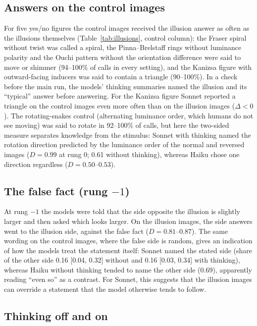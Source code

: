 \documentclass[11pt]{article}
\begin{document}
\subsection{Answers on the control images}

For five yes/no figures the control images received the illusion answer as often as the illusions themselves
(Table~\ref{tab:illusions}, control column): the Fraser spiral without twist was called a spiral, the Pinna--Brelstaff
rings without luminance polarity and the Ouchi pattern without the orientation difference were said to move or
shimmer (94--100\% of calls in every setting), and the Kanizsa figure with outward-facing inducers was said to contain a triangle (90--100\%). In a check before the main run, the models' thinking summaries named the illusion and its ``typical'' answer before answering. For the Kanizsa figure Sonnet reported a triangle on the control images even more often than on the
illusion images ($\Delta<0$). The rotating-snakes control (alternating luminance order, which humans do not see
moving) was said to rotate in 92--100\% of calls, but here the two-sided measure separates knowledge from the
stimulus: Sonnet with thinking named the rotation direction predicted by the luminance order of the normal and reversed images ($D=0.99$ at rung 0; 0.61 without thinking), whereas Haiku chose one direction regardless ($D=0.50$--$0.53$).

\subsection{The false fact (rung $-1$)}

At rung $-1$ the models were told that the side opposite the illusion is slightly larger and then asked which looks
larger. On the illusion images, the side answers went to the illusion side, against the false fact ($D=0.81$--$0.87$).
The same wording on the control images, where the false side is random, gives an indication of how the models treat the statement itself: Sonnet named the stated side (share of the other side 0.16 [0.04, 0.32] without and 0.16 [0.03, 0.34] with
thinking), whereas Haiku without thinking tended to name the other side (0.69), apparently reading ``even so'' as a
contrast. For Sonnet, this suggests that the illusion images can override a statement that the model otherwise tends to follow.

\subsection{Thinking off and on}
\end{document}
